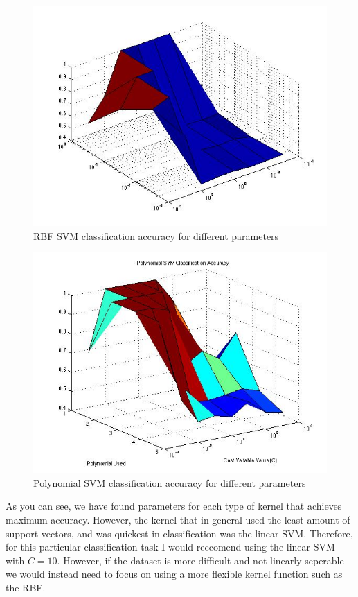 \documentclass[paper=a4, fontsize=11pt]{scrartcl} %
\begin{document}
\begin{figure}
\centering
\includegraphics[scale=0.4]{RBF2.jpg}
\caption{RBF SVM classification accuracy for different parameters}
\label{fig:plot_2d}
\end{figure}

\begin{figure}
\centering
\includegraphics[scale=0.4]{Ploy.jpg}
\caption{Polynomial SVM classification accuracy for different parameters }
\label{fig:plot_2d}
\end{figure}

As you can see, we have found parameters for each type of kernel that achieves maximum accuracy. 
However, the kernel that in general used the least amount of support vectors, and was quickest in classification was the linear SVM.
Therefore, for this particular classification task I would reccomend using the linear SVM with $C=10$.
However, if the dataset is more difficult and not linearly seperable we would instead need to focus on using a more flexible kernel function such as the RBF.
\end{document}
